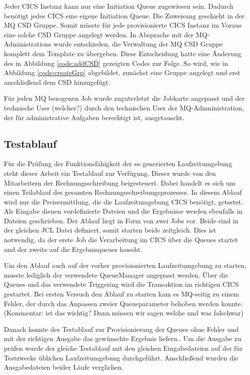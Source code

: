 Jeder CICS Instanz kann nur eine Initiation Queue zugewiesen sein.
Dadurch benötigt jedes CICS eine eigene Initiation Queue.
Die Zuweisung geschieht in der MQ CSD Gruppe.
Somit müsste für jede provisionierte CICS Instanz im Voraus eine solche CSD Gruppe angelegt werden.
In Absprache mit der MQ-Administrations  wurde entschieden, die Verwaltung der MQ CSD Gruppe komplett dem Template zu übergeben.
Diese Entscheidung hatte eine Änderung des in Abbildung \ref{code:addCSD} gezeigten Codes zur Folge.
So wird, wie in Abbildung \ref{code:createGrp} abgebildet, zunächst eine Gruppe angelegt und erst anschließend dem CSD hinzugefügt.

Für jeden MQ bezogenen Job wurde zuguterletzt die Jobkarte angepasst und der technische User (welcher?) durch den technischen User der MQ-Admninistration, der für administrative Aufgaben berechtigt ist, ausgetauscht.

\subsection{Testablauf}
Für die Prüfung der Funktionsfähigkeit der so generierten Laufzeitumgebung steht dieser Arbeit ein Testablauf zur Verfügung.
Dieser wurde von den Mitarbeitern der Rechnungsschreibung beigesteuert.
Dabei handelt es sich um einen Teilablauf des gesamten Rechnungsschreibungsprozesses.
In diesem Ablauf wird nur die Preisermittlung, die die Laufzeitumgebung CICS benötigt, getestet.
Als Eingabe dienen vordefinierte Dateien und die Ergebnisse werden ebenfalls in Dateien geschrieben.
Der Ablauf liegt in Form von zwei Jobs vor.
Beide sind in der gleichen JCL Datei definiert, somit starten beide zeitgleich.
Dies ist notwendig, da der erste Job die Verarbeitung im CICS über die Queues startet und der zweite auf die Ergebnisqueues lauscht.

Um den Ablauf auch auf der vorher provisionierten Laufzeitumgebung zu starten, musste lediglich der verwendete QueueManager angepasst werden.
Über die Queues und das verwendete Triggering wird die Transaktion im richtigen CICS gestartet.
Bei ersten Versuch den Ablauf zu starten kam es MQ-seitig zu einem Fehler, der durch das Anpassen zweier Queueparameter behoben werden konnte. (Kommentar: ist das wichtig? Dann müssen wir sagen welche und was falschwar)

Danach konnte der Testablauf zur Provisionierung der Queues ohne Fehler und mit der richtigen Ausgabe das gewünschte Ergebnis liefern..
Um die Ausgabe zu prüfen wurde der gleiche Testablauf mit den gleichen Eingabedateien auf der für Testzwecke üblichen Laufzeitumgebung durchgeführt.
Anschließend wurden die Ausgabedateien beider Läufe verglichen.

